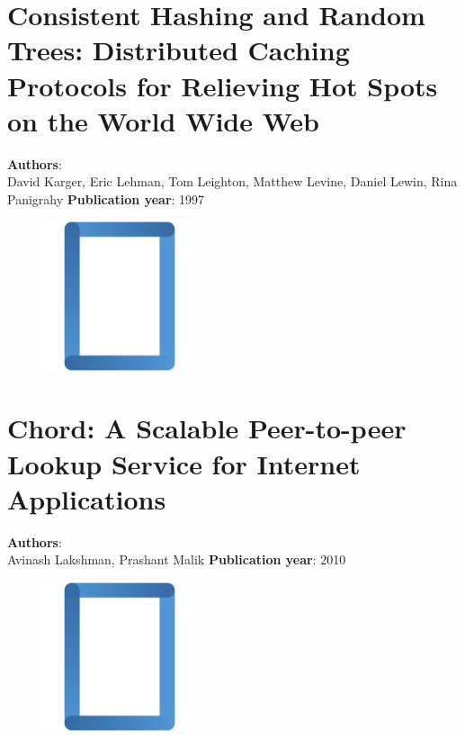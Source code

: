 \documentclass[11pt,fleqn]{book} %
\begin{document}
\chapter{Consistent Hashing and Random Trees: Distributed Caching Protocols for Relieving Hot Spots on the World Wide Web}
\vspace*{-7mm}
\Large \textbf{Authors}: \\
David Karger, Eric Lehman, Tom Leighton, Matthew Levine, Daniel Lewin, Rina Panigrahy
\newline\newline
\textbf{Publication year}: 1997
\begin{figure}[b]
    \centering
    \includegraphics[width=0.4\textwidth]{distributed-systems-rectangle-blue.pdf}
\end{figure}


\chapter{Chord: A Scalable Peer-to-peer Lookup Service for Internet Applications}
\vspace*{-7mm}
\Large \textbf{Authors}: \\
Avinash Lakshman, Prashant Malik
\newline\newline
\textbf{Publication year}: 2010
\begin{figure}[b]
    \centering
    \includegraphics[width=0.4\textwidth]{distributed-systems-rectangle-blue.pdf}
\end{figure}

\end{document}
